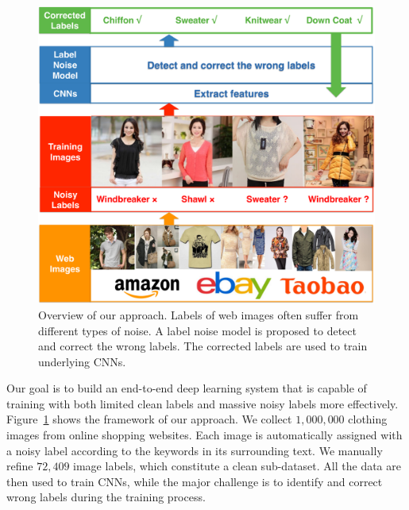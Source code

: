 \begin{figure}[t]
\begin{center}
\includegraphics[width=1.0\linewidth]{figures/noisy_labels/overview.pdf}
\end{center}
\caption{Overview of our approach. Labels of web images often suffer from different types of noise. A label noise model is proposed to detect and correct the wrong labels. The corrected labels are used to train underlying CNNs.}
\label{fig:nl-overview}
\end{figure}

Our goal is to build an end-to-end deep learning system that is capable of training with both limited clean labels and massive noisy labels more effectively. Figure~\ref{fig:nl-overview} shows the framework of our approach. We collect $1,000,000$ clothing images from online shopping websites. Each image is automatically assigned with a noisy label according to the keywords in its surrounding text. We manually refine $72,409$ image labels, which constitute a clean sub-dataset. All the data are then used to train CNNs, while the major challenge is to identify and correct wrong labels during the training process.

